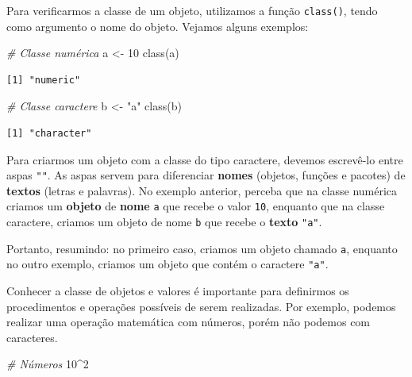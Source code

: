 \documentclass[
  brazilian,
]{book}
\newenvironment{Shaded}{\begin{snugshade}}{\end{snugshade}}
\newcommand{\CommentTok}[1]{\textcolor[rgb]{0.56,0.35,0.01}{\textit{#1}}}
\newcommand{\DecValTok}[1]{\textcolor[rgb]{0.00,0.00,0.81}{#1}}
\newcommand{\FunctionTok}[1]{\textcolor[rgb]{0.00,0.00,0.00}{#1}}
\newcommand{\NormalTok}[1]{#1}
\newcommand{\OtherTok}[1]{\textcolor[rgb]{0.56,0.35,0.01}{#1}}
\newcommand{\SpecialCharTok}[1]{\textcolor[rgb]{0.00,0.00,0.00}{#1}}
\newcommand{\StringTok}[1]{\textcolor[rgb]{0.31,0.60,0.02}{#1}}
\begin{document}
Para verificarmos a classe de um objeto, utilizamos a função \texttt{class()}, tendo como argumento o nome do objeto. Vejamos alguns exemplos:

\begin{Shaded}
\begin{Highlighting}[]
\CommentTok{\# Classe numérica}
\NormalTok{a }\OtherTok{\textless{}{-}} \DecValTok{10}
\FunctionTok{class}\NormalTok{(a)}
\end{Highlighting}
\end{Shaded}

\begin{verbatim}
[1] "numeric"
\end{verbatim}

\begin{Shaded}
\begin{Highlighting}[]
\CommentTok{\# Classe caractere}
\NormalTok{b }\OtherTok{\textless{}{-}} \StringTok{"a"}
\FunctionTok{class}\NormalTok{(b)}
\end{Highlighting}
\end{Shaded}

\begin{verbatim}
[1] "character"
\end{verbatim}

Para criarmos um objeto com a classe do tipo caractere, devemos escrevê-lo entre aspas \texttt{""}. As aspas servem para diferenciar \textbf{nomes} (objetos, funções e pacotes) de \textbf{textos} (letras e palavras). No exemplo anterior, perceba que na classe numérica criamos um \textbf{objeto} de \textbf{nome} \texttt{a} que recebe o valor \texttt{10}, enquanto que na classe caractere, criamos um objeto de nome \texttt{b} que recebe o \textbf{texto} \texttt{"a"}.

Portanto, resumindo: no primeiro caso, criamos um objeto chamado \texttt{a}, enquanto no outro exemplo, criamos um objeto que contém o caractere \texttt{"a"}.

Conhecer a classe de objetos e valores é importante para definirmos os procedimentos e operações possíveis de serem realizadas. Por exemplo, podemos realizar uma operação matemática com números, porém não podemos com caracteres.

\begin{Shaded}
\begin{Highlighting}[]
\CommentTok{\# Números}
\DecValTok{10}\SpecialCharTok{\^{}}\DecValTok{2}
\end{Highlighting}
\end{Shaded}
\end{document}
